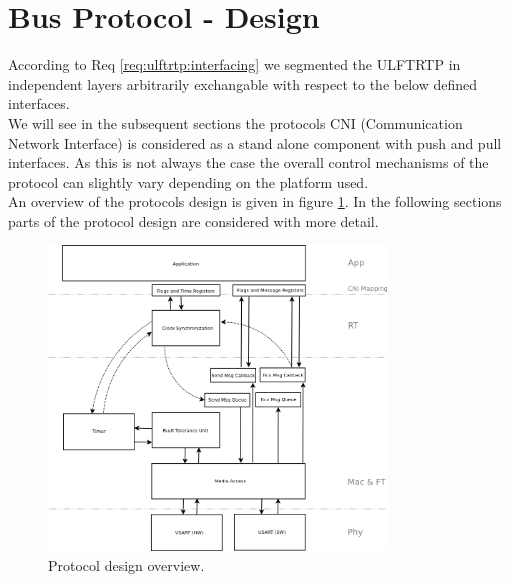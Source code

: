 \section{Bus Protocol - Design}
\label{sec:bus:design}

According to Req \ref{req:ulftrtp:interfacing} we segmented the ULFTRTP in independent layers arbitrarily exchangable with respect to the below defined interfaces.\\

We will see in the subsequent sections the protocols CNI (Communication Network Interface) is considered as a stand alone component with push and pull interfaces.
As this is not always the case the overall control mechanisms of the protocol can slightly vary depending on the platform used.\\

An overview of the protocols design is given in figure \ref{fig:bus:design:overview}. In the following sections parts of the protocol design are considered with more detail.

\begin{figure}[h]
\centering
\includegraphics[width=0.8\textwidth]{images/protocol_design_overview.png}
\caption{Protocol design overview.}
\label{fig:bus:design:overview}
\end{figure}





